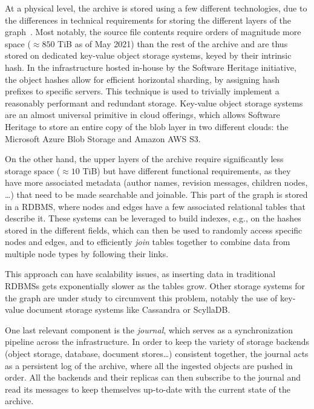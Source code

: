 At a physical level, the archive is stored using a few different technologies,
due to the differences in technical requirements for storing the different
layers of the graph~\cite{swhipres2017}.
Most notably, the source file contents require orders of magnitude more space
($\approx 850$ TiB as of May 2021) than the rest of the archive and are thus
stored on dedicated key-value object storage systems, keyed by their intrinsic
hash.  In the infrastructure hosted in-house by the Software Heritage
initiative, the object hashes allow for efficient horizontal sharding, by
assigning hash prefixes to specific servers. This technique is used to
trivially implement a reasonably performant and redundant storage.
Key-value object storage systems are an almost universal primitive in cloud
offerings, which allows Software Heritage to store an entire copy of the
blob layer in two different clouds: the Microsoft Azure Blob Storage and
Amazon AWS S3.

On the other hand, the upper layers of the archive require significantly less
storage space ($\approx 10$ TiB) but have different functional requirements, as
they have more associated metadata (author names, revision messages, children
nodes, …) that need to be made searchable and joinable. This part of the graph
is stored in a \gls{RDBMS}, where nodes and edges have a few associated
relational tables that describe it. These systems can be leveraged to build
indexes, e.g., on the hashes stored in the different fields, which can then be
used to randomly access specific nodes and edges, and to efficiently
\emph{join} tables together to combine data from multiple node types by
following their links.

This approach can have scalability issues, as inserting data in traditional
\glspl{RDBMS} gets exponentially slower as the tables grow.  Other storage
systems for the graph are under study to circumvent this problem, notably the
use of key-value document storage systems like Cassandra or ScyllaDB\@.

One last relevant component is the \emph{journal}, which serves as a
synchronization pipeline across the infrastructure. In order to keep the
variety of storage backends (object storage, database, document stores…)
consistent together, the journal acts as a persistent log of the archive, where
all the ingested objects are pushed in order. All the backends and their
replicas can then subscribe to the journal and read its messages to keep
themselves up-to-date with the current state of the archive.
